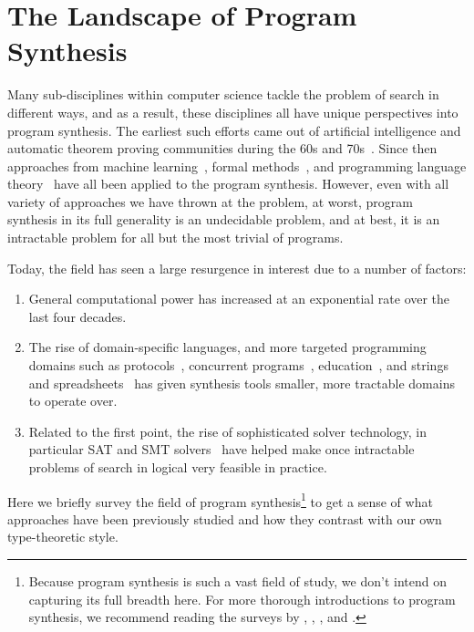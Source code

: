 \section{The Landscape of Program Synthesis}
\label{sec:the-landscape-of-program-synthesis}

Many sub-disciplines within computer science tackle the problem of search in different ways, and as a result, these disciplines all have unique perspectives into program synthesis.
The earliest such efforts came out of artificial intelligence and automatic theorem proving communities during the 60s and 70s~\citep{green-ijcai-1969, summers-popl-1976}.
Since then approaches from machine learning~\citep{lau-thesis-2001, briggs-kes-2008, weimer-icse-2009}, formal methods~\citep{srivastava-popl-2010, bodik-popl-2010, kuncak-pldi-2010}, and programming language theory~\citep{albarghouthi-cav-2013, gvero-pldi-2013, scherer-icfp-2015} have all been applied to the program synthesis.
However, even with all variety of approaches we have thrown at the problem, at worst, program synthesis in its full generality is an undecidable problem, and at best, it is an intractable problem for all but the most trivial of programs.

Today, the field has seen a large resurgence in interest due to a number of factors:
\begin{enumerate}
  \item General computational power has increased at an exponential rate over the last four decades.~\citep{moore-electronics-1965}
  \item The rise of domain-specific languages, and more targeted programming domains such as protocols~\citep{alur-popl-2005, udupa-pldi-2013}, concurrent programs~\citep{solar-lezama-pldi-2008, cerny-cav-2011, prountzos-oopsla-2012}, education~\citep{singh-pldi-2013}, and strings and spreadsheets~\citep{gulwani-popl-2011} has given synthesis tools smaller, more tractable domains to operate over.
  \item Related to the first point, the rise of sophisticated solver technology, in particular SAT and SMT solvers~\citep{barrett-smt-2008} have helped make once intractable problems of search in logical very feasible in practice.
\end{enumerate}
Here we briefly survey the field of program synthesis\footnote{%
  Because program synthesis is such a vast field of study, we don't intend on capturing its full breadth here.
  For more thorough introductions to program synthesis, we recommend reading the surveys by \citet{kreitz-automated-deduction-1998}, \citet{flener-jlp-1999}, \citet{gulwani-ppdp-2010}, and \citet{kitzelmann-aaip-2010}.
} to get a sense of what approaches have been previously studied and how they contrast with our own type-theoretic style.

